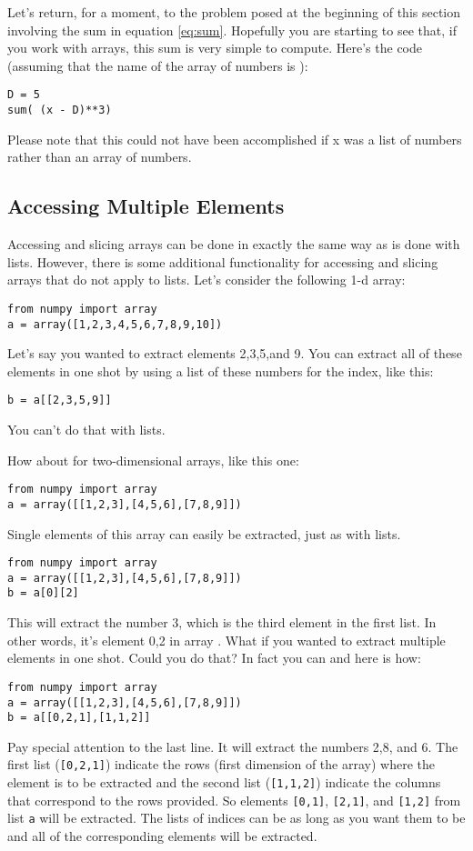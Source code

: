 Let's return, for a moment, to the problem posed at the beginning
of this section involving the sum in equation \ref{eq:sum}.
Hopefully you are starting to see that, if you work with arrays, this
sum is very simple to compute.  Here's the code (assuming that the
name of the array of numbers is ):
\begin{Verbatim}
D = 5
sum( (x - D)**3)
\end{Verbatim}
Please note that this could not have been accomplished if x was a list
of numbers rather than an array of numbers.

\subsection*{Accessing Multiple Elements}
Accessing and slicing arrays can be done in exactly the same way as is
done with lists.  However, there is some additional functionality for
accessing and slicing arrays that do not apply to lists.  Let's
consider the following 1-d array:
\begin{Verbatim}
from numpy import array
a = array([1,2,3,4,5,6,7,8,9,10])
\end{Verbatim}
Let's say you wanted to extract elements 2,3,5,and 9.  You can extract
all of these elements in one shot by using a list of these numbers for
the index, like this:
\begin{Verbatim}
b = a[[2,3,5,9]]
\end{Verbatim}
You can't do that with lists.

How about for two-dimensional arrays, like this one:
\begin{Verbatim}
from numpy import array
a = array([[1,2,3],[4,5,6],[7,8,9]])
\end{Verbatim}
Single elements of this array can easily be extracted, just as with
lists.
\begin{Verbatim}
from numpy import array
a = array([[1,2,3],[4,5,6],[7,8,9]])
b = a[0][2]
\end{Verbatim}
This will extract the number 3, which is the third element in the
first list.  In other words, it's element 0,2 in array .
What if you wanted to extract multiple elements in one shot.  Could
you do that?  In fact you can and here is how:
\begin{Verbatim}
from numpy import array
a = array([[1,2,3],[4,5,6],[7,8,9]])
b = a[[0,2,1],[1,1,2]]
\end{Verbatim}
Pay special attention to the last line.  It will extract the numbers
2,8, and 6.  The first list (\texttt{[0,2,1]}) indicate the rows
(first dimension of the array) where the element is to be extracted
and the second list (\texttt{[1,1,2]}) indicate the columns that
correspond to the rows provided.  So elements \texttt{[0,1]},
\texttt{[2,1]}, and \texttt{[1,2]} from list \texttt{a} will be
extracted.  The lists of indices can be as long as you want them to be
and all of the corresponding elements will be extracted.

